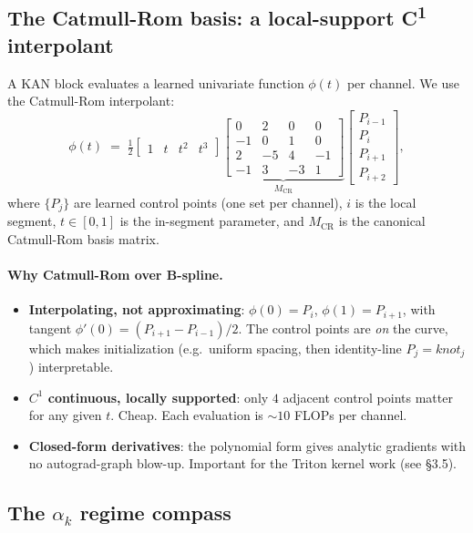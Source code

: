 \documentclass[11pt,a4paper]{article}
\theoremstyle{plain}
\theoremstyle{definition}
\begin{document}
\subsection{The Catmull-Rom basis: a local-support C\textsuperscript{1} interpolant}

A KAN block evaluates a learned univariate function $\phi(t)$ per
channel. We use the Catmull-Rom interpolant:
\[
\phi(t) \;=\; \tfrac{1}{2}
\begin{bmatrix} 1 & t & t^2 & t^3 \end{bmatrix}
\underbrace{\begin{bmatrix}
 0 &  2 &  0 &  0 \\
-1 &  0 &  1 &  0 \\
 2 & -5 &  4 & -1 \\
-1 &  3 & -3 &  1
\end{bmatrix}}_{M_{\mathrm{CR}}}
\begin{bmatrix} P_{i-1} \\ P_i \\ P_{i+1} \\ P_{i+2} \end{bmatrix},
\]
where $\{P_j\}$ are learned control points (one set per channel),
$i$ is the local segment, $t \in [0, 1]$ is the in-segment
parameter, and $M_{\mathrm{CR}}$ is the canonical Catmull-Rom
basis matrix.

\paragraph{Why Catmull-Rom over B-spline.}
\begin{itemize}
\item \textbf{Interpolating, not approximating}: $\phi(0) = P_i$,
      $\phi(1) = P_{i+1}$, with tangent $\phi'(0) = (P_{i+1} - P_{i-1})/2$.
      The control points are \emph{on} the curve, which makes
      initialization (e.g.\ uniform spacing, then identity-line
      $P_j = \mathit{knot}_j$) interpretable.
\item \textbf{$C^1$ continuous, locally supported}: only $4$
      adjacent control points matter for any given $t$. Cheap.
      Each evaluation is $\sim 10$ FLOPs per channel.
\item \textbf{Closed-form derivatives}: the polynomial form gives
      analytic gradients with no autograd-graph blow-up. Important
      for the Triton kernel work (see §3.5).
\end{itemize}

\subsection{The $\alpha_k$ regime compass}
\end{document}
